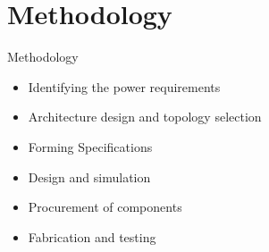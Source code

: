 \documentclass[aspectratio=169]{beamer}
\begin{document}
	\section{Methodology}	
	\begin{frame}{Methodology}
		\begin{itemize}
			
			\item Identifying the power requirements
			\item Architecture design and topology selection
			\item Forming Specifications
			
			\item Design and simulation
			\item Procurement of components
			\item Fabrication and testing
			
		\end{itemize} 
		
	\end{frame}
\end{document}
